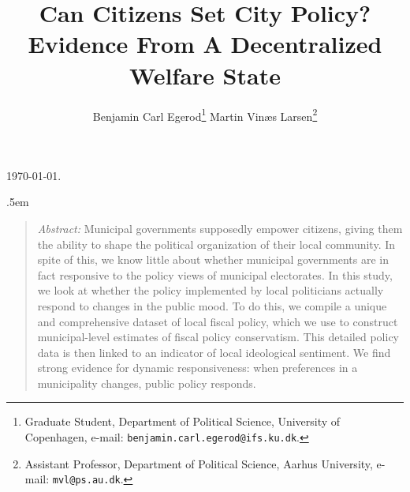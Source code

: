 \documentclass[a4paper,12pt]{article}
\title{\bigskip \bigskip \sffamily \LARGE{Can Citizens Set City Policy?} \\ \Large{ Evidence From A Decentralized Welfare State}}
\author{\bigskip Benjamin Carl Egerod\footnote{Graduate Student, Department of Political Science, University of Copenhagen, e-mail: \texttt{benjamin.carl.egerod@ifs.ku.dk}.} \qquad Martin Vinæs Larsen\footnote{Assistant Professor, Department of Political Science, Aarhus University, e-mail: \texttt{mvl@ps.au.dk}.}}
\makeatletter
\renewcommand{\maketitle}{
	\begin{flushleft}
		
		\onehalfspacing
		
		\@title
		
		\lineskip .5em
		\normalfont{\normalsize{\@author}}
\end{flushleft}}
\makeatother
\begin{document}
	
\begin{footnotesize} \noindent \today. \end{footnotesize} %

\vspace{0.7in}

\maketitle

\bigskip

\begin{quotation} %
	
	\small \noindent \emph{Abstract:} Municipal governments supposedly empower citizens, giving them the ability to shape the political organization of their local community. In spite of this, we know little about whether municipal governments are in fact responsive to the policy views of municipal electorates. In this study, we look at whether the policy implemented by local politicians actually respond to changes in the public mood. To do this, we compile a unique and comprehensive dataset of local fiscal policy, which we use to construct municipal-level estimates of fiscal policy conservatism. This detailed policy data is then linked to an indicator of local ideological sentiment. We find strong evidence for dynamic responsiveness: when preferences in a municipality changes, public policy responds.
\end{quotation}




\thispagestyle{empty} %






\clearpage

\end{document}
